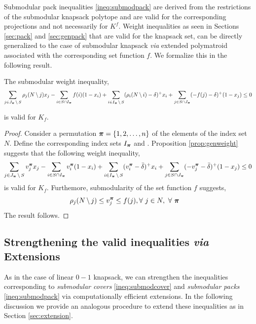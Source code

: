 \documentclass[10pt,twoside]{amsart}
\begin{document}
Submodular pack inequalities \eqref{ineq:submodpack} are derived from the restrictions of the submodular knapsack polytope and are valid for the corresponding projections and not necessarily for $K^f$. Weight inequalities \cite{Weismantel97} as seen in Sections \ref{sec:pack} and \ref{sec:genpack} that are valid for the knapsack set, can be directly generalized to the case of submodular knapsack \textit{via} extended polymatroid associated with the corresponding set function $f$. We formalize this in the following result.

\begin{prop}
  The submodular weight inequality,
  \begin{align}
    \sum_{j\in J_{\boldsymbol\pi}\,\backslash\, S} \rho_{j}(N\,\backslash\, j)x_j - \sum_{i \in S\cap I_{\boldsymbol\pi}} f(i)(1-x_i) + \sum_{i \in I_{\boldsymbol\pi}\,\backslash\, S} (\rho_{i}(N\,\backslash\, i) - \delta)^+x_i + \sum_{j \in S\cap J_{\boldsymbol\pi}} (-f(j) - \delta)^+ (1-x_j) \leq 0
  \end{align}

  is valid for $K_f$.
\end{prop}
\begin{proof}
  Consider a permutation $\boldsymbol\pi = \{1,2,\ldots,n\}$ of the elements of the index set $N$. Define the corresponding index sets $I_{\boldsymbol\pi}$ and . Proposition \ref{prop:genweight} suggests that the following weight inequality,
  \begin{align*}
     \sum_{j \in J_{\boldsymbol\pi}\,\backslash\, S} v^{\boldsymbol\pi}_j x_j - \sum_{i\in  S\cap I_{\boldsymbol\pi}} v^{\boldsymbol\pi}_i(1-x_i) + \sum_{i \in  I_{\boldsymbol\pi}\,\backslash\, S} (v^{\boldsymbol\pi}_i - \bar{\delta})^+ x_i + \sum_{j \in S\cap J_{\boldsymbol\pi}} (-v^{\boldsymbol\pi}_j - \bar{\delta})^+ (1-x_j) \leq 0
  \end{align*}
is valid for $K_f$.  Furthemore, submodularity of the set function $f$ suggests,
\begin{align*}
	 \rho_{j}(N\,\backslash\, j) \leq v^{\boldsymbol\pi}_j \leq f(j),\, & \forall \,\, j \in  N,\,\, \forall \,\,\boldsymbol\pi
\end{align*}
The result follows.
\end{proof}
\begin{example}
\tba
\end{example}
\subsection{Strengthening the valid inequalities \textit{via} Extensions}\hfill

As in the case of linear $0-1$ knapsack, we can strengthen the inequalities corresponding to \textit{submodular covers} \eqref{ineq:submodcover} and \textit{submodular packs} \eqref{ineq:submodpack} via computationally efficient extensions. In the following discussion we provide an analogous procedure to extend these inequalities as in Section \ref{sec:extension}.
\end{document}
